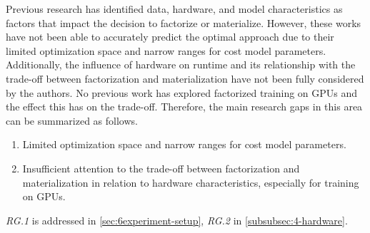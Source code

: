 Previous research has identified data, hardware, and model characteristics as factors that impact the decision to factorize or materialize. However, these works have not been able to accurately predict the optimal approach due to their limited optimization space and narrow ranges for cost model parameters. Additionally, the influence of hardware on runtime and its relationship with the trade-off between factorization and materialization have not been fully considered by the authors. No previous work has explored factorized training on GPUs and the effect this has on the trade-off. Therefore, the main research gaps in this area can be summarized as follows.
\begin{enumerate}[leftmargin=1.5cm, label=\emph{RG.\arabic*}]
    \item Limited optimization space and narrow ranges for cost model parameters.
    \item Insufficient attention to the trade-off between factorization and materialization in relation to hardware characteristics, especially for training on GPUs.
\end{enumerate}
\emph{RG.1} is addressed in \autoref{sec:6experiment-setup}, \emph{RG.2} in \autoref{subsubsec:4-hardware}.